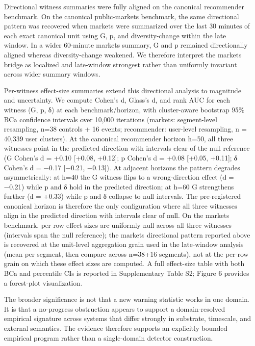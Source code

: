 \documentclass[
  11pt,
]{article}
\begin{document}
Directional witness summaries were fully aligned on the canonical
recommender benchmark. On the canonical public-markets benchmark, the
same directional pattern was recovered when markets were summarized over
the last 30 minutes of each exact canonical unit using G, p, and
diversity-change within the late window. In a wider 60-minute markets
summary, G and p remained directionally aligned whereas diversity-change
weakened. We therefore interpret the markets bridge as localized and
late-window strongest rather than uniformly invariant across wider
summary windows.

Per-witness effect-size summaries extend this directional analysis to
magnitude and uncertainty. We compute Cohen's d, Glass's d, and rank AUC
for each witness (G, p, δ) at each benchmark/horizon, with cluster-aware
bootstrap 95\% BCa confidence intervals over 10,000 iterations (markets:
segment-level resampling, n=38 controls + 16 events; recommender:
user-level resampling, n = 40,339 user clusters). At the canonical
recommender horizon h=50, all three witnesses point in the predicted
direction with intervals clear of the null reference (G Cohen's d =
+0.10 {[}+0.08, +0.12{]}; p Cohen's d = +0.08 {[}+0.05, +0.11{]}; δ
Cohen's d = −0.17 {[}−0.21, −0.13{]}). At adjacent horizons the pattern
degrades asymmetrically: at h=40 the G witness flips to a
wrong-direction effect (d = −0.21) while p and δ hold in the predicted
direction; at h=60 G strengthens further (d = +0.33) while p and δ
collapse to null intervals. The pre-registered canonical horizon is
therefore the only configuration where all three witnesses align in the
predicted direction with intervals clear of null. On the markets
benchmark, per-row effect sizes are uniformly null across all three
witnesses (intervals span the null reference); the markets directional
pattern reported above is recovered at the unit-level aggregation grain
used in the late-window analysis (mean per segment, then compare across
n=38+16 segments), not at the per-row grain on which these effect sizes
are computed. A full effect-size table with both BCa and percentile CIs
is reported in Supplementary Table S2; Figure 6 provides a forest-plot
visualization.

The broader significance is not that a new warning statistic works in
one domain. It is that a no-progress obstruction appears to support a
domain-resolved empirical signature across systems that differ strongly
in substrate, timescale, and external semantics. The evidence therefore
supports an explicitly bounded empirical program rather than a
single-domain detector construction.
\end{document}
